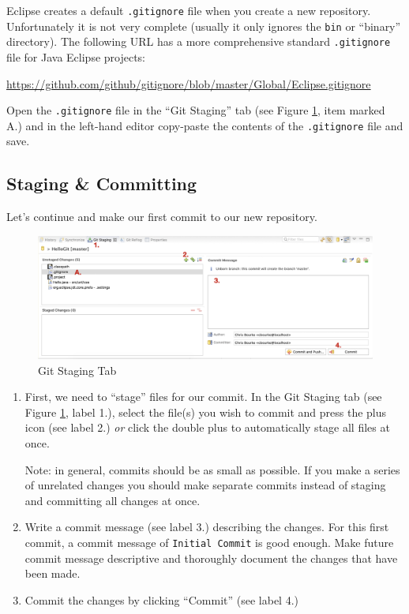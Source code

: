 \documentclass[12pt]{scrartcl}
\begin{document}
Eclipse creates a default \texttt{.gitignore} file when you
create a new repository.  Unfortunately it is not very complete (usually
it only ignores the \texttt{bin} or ``binary'' directory). 
The following URL has a more comprehensive standard \texttt{.gitignore}
file for Java Eclipse projects:

\url{https://github.com/github/gitignore/blob/master/Global/Eclipse.gitignore}

Open the \texttt{.gitignore} file in the ``Git Staging'' tab (see
Figure \ref{fig:gitStaging}, item marked A.) and in the left-hand editor copy-paste
the contents of the \texttt{.gitignore} file and save.

\subsection{Staging \& Committing} 

Let's continue and make our first commit to our new repository.

\begin{figure}[h]
\centering
\includegraphics[scale=0.35]{./hack1.0-files/eclipseGitStagingMarkUp}
\caption{Git Staging Tab}
\label{fig:gitStaging}
\end{figure}

\begin{enumerate}  
  \item First, we need to ``stage'' files for our commit.  In the Git Staging
  tab (see Figure \ref{fig:gitStaging}, label 1.), select the file(s) you wish to commit
  and press the plus icon (see label 2.) \emph{or} click the double plus to 
  automatically stage all files at once.  
  
  Note: in general, commits should be as small as possible.  If you make 
  a series of unrelated changes you should make separate commits instead of 
  staging and committing all changes at once.
  
  \item Write a commit message (see label 3.) describing the changes.  For
  this first commit, a commit message of \texttt{Initial Commit} is good
  enough.  Make future commit message descriptive and thoroughly 
  document the changes that have been made.  
  
  \item Commit the changes by clicking ``Commit'' (see label 4.)
\end{enumerate}
\end{document}
